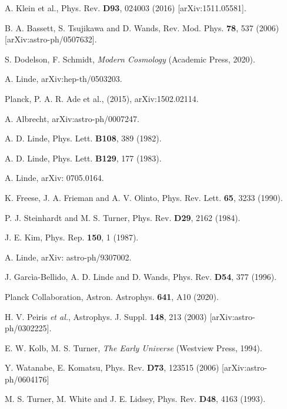 \documentclass[11pt,a4paper,twoside]{book}
\begin{document}
\begin{thebibliography}{2}
	 A. Klein et al., Phys. Rev. \textbf{D93}, 024003 (2016) [arXiv:1511.05581].
	
	 B. A. Bassett, S. Tsujikawa and D. Wands, Rev. Mod. Phys. \textbf{78}, 537 (2006) [arXiv:astro-ph/0507632].
	
	 S. Dodelson, F. Schmidt, \emph{Modern Cosmology} (Academic Press, 2020).
	
	 A. Linde, arXiv:hep-th/0503203.
	
	 Planck, P. A. R. Ade et al., (2015), arXiv:1502.02114.
	
	 A. Albrecht, arXiv:astro-ph/0007247.
	
	 A. D. Linde, Phys. Lett. \textbf{B108}, 389 (1982).
	
	 A. D. Linde, Phys. Lett. \textbf{B129}, 177  (1983).  
	
	 A. Linde, arXiv: 0705.0164. 
	
	 K. Freese, J. A. Frieman and A. V. Olinto, Phys. Rev. Lett. \textbf{65}, 3233 (1990).
	
	 P. J. Steinhardt and M. S. Turner, Phys. Rev. \textbf{D29}, 2162 (1984).
	
	 J. E. Kim, Phys. Rep. \textbf{150}, 1 (1987).
	
	 A. Linde, arXiv: astro-ph/9307002.
	
	 J. Garcìa-Bellido, A. D. Linde and D. Wands, Phys. Rev. \textbf{D54}, 377 (1996).
	
	 Planck Collaboration, Astron. Astrophys. \textbf{641}, A10 (2020).
	
	 H. V. Peiris \textit{et al.}, Astrophys. J. Suppl. \textbf{148}, 213 (2003) [arXiv:astro-ph/0302225].
	
	 E. W. Kolb, M. S. Turner, \textit{The Early Universe} (Westview Press, 1994).
	
	 Y. Watanabe, E. Komatsu, Phys. Rev. \textbf{D73}, 123515 (2006) [arXiv:astro-ph/0604176]
	
	 M. S. Turner, M. White and J. E. Lidsey, Phys. Rev. \textbf{D48}, 4163 (1993).
	

\end{thebibliography}
\end{document}
